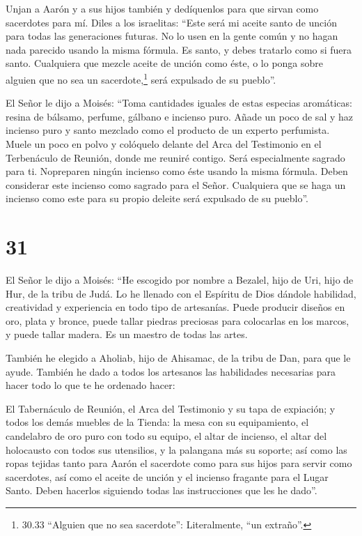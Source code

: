  Unjan a Aarón y a sus hijos también y dedíquenlos para que
sirvan como sacerdotes para mí.  Diles a los israelitas:
``Este será mi aceite santo de unción para todas las generaciones
futuras.  No lo usen en la gente común y no hagan nada
parecido usando la misma fórmula. Es santo, y debes tratarlo como si
fuera santo.  Cualquiera que mezcle aceite de unción como
éste, o lo ponga sobre alguien que no sea un sacerdote,\footnote{30.33
  ``Alguien que no sea sacerdote'': Literalmente, ``un extraño''.} será
expulsado de su pueblo''.

 El Señor le dijo a Moisés: ``Toma cantidades iguales de
estas especias aromáticas: resina de bálsamo, perfume, gálbano e
incienso puro.  Añade un poco de sal y haz incienso puro y
santo mezclado como el producto de un experto perfumista. 
Muele un poco en polvo y colóquelo delante del Arca del Testimonio en el
Terbenáculo de Reunión, donde me reuniré contigo. Será especialmente
sagrado para ti.  Nopreparen ningún incienso como éste
usando la misma fórmula. Deben considerar este incienso como sagrado
para el Señor.  Cualquiera que se haga un incienso como
este para su propio deleite será expulsado de su pueblo''.

\hypertarget{section-30}{%
\section{31}\label{section-30}}

 El Señor le dijo a Moisés:  ``He escogido por
nombre a Bezalel, hijo de Uri, hijo de Hur, de la tribu de Judá.
 Lo he llenado con el Espíritu de Dios dándole habilidad,
creatividad y experiencia en todo tipo de artesanías.  Puede
producir diseños en oro, plata y bronce,  puede tallar
piedras preciosas para colocarlas en los marcos, y puede tallar madera.
Es un maestro de todas las artes.

 También he elegido a Aholiab, hijo de Ahisamac, de la tribu
de Dan, para que le ayude. También he dado a todos los artesanos las
habilidades necesarias para hacer todo lo que te he ordenado hacer:

 El Tabernáculo de Reunión, el Arca del Testimonio y su tapa
de expiación; y todos los demás muebles de la Tienda:  la
mesa con su equipamiento, el candelabro de oro puro con todo su equipo,
el altar de incienso,  el altar del holocausto con todos sus
utensilios, y la palangana más su soporte;  así como las
ropas tejidas tanto para Aarón el sacerdote como para sus hijos para
servir como sacerdotes,  así como el aceite de unción y el
incienso fragante para el Lugar Santo. Deben hacerlos siguiendo todas
las instrucciones que les he dado''.


